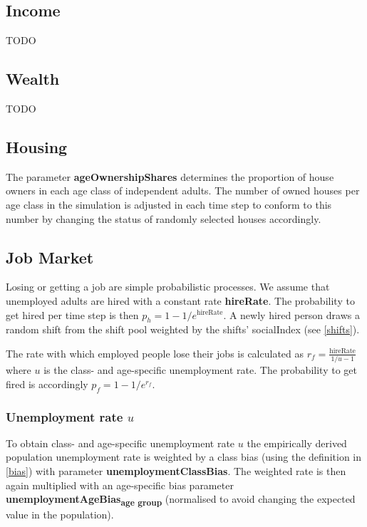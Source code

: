 \documentclass{article}
\begin{document}
\subsection{Income}

TODO

\subsection{Wealth}

TODO

\subsection{Housing}

The parameter \textbf{ageOwnershipShares} determines the proportion of house owners in each age class of independent adults. The number of owned houses per age class in the simulation is adjusted in each time step to conform to this number by changing the status of randomly selected houses accordingly.

\subsection{Job Market}

Losing or getting a job are simple probabilistic processes. We assume that unemployed adults are hired with a constant rate \textbf{hireRate}. The probability to get hired per time step is then $p_h=1-1/e^\textrm{hireRate}$. A newly hired person draws a random shift from the shift pool weighted by the shifts' \textsf{socialIndex} (see \ref{shifts}).

The rate with which employed people lose their jobs is calculated as $r_f = \frac{\textrm{hireRate}}{1/u - 1}$ where $u$ is the class- and age-specific unemployment rate. The probability to get fired is accordingly $p_f = 1-1/e^{r_f}$. 

\subsubsection*{Unemployment rate $u$}

To obtain class- and age-specific unemployment rate $u$ the empirically derived population unemployment rate is weighted by a class bias (using the definition in \ref{bias}) with parameter \textbf{unemploymentClassBias}. The weighted rate is then again multiplied with an age-specific bias parameter \textbf{unemploymentAgeBias}\textsubscript{\textbf{age group}} (normalised to avoid changing the expected value in the population).
\end{document}
